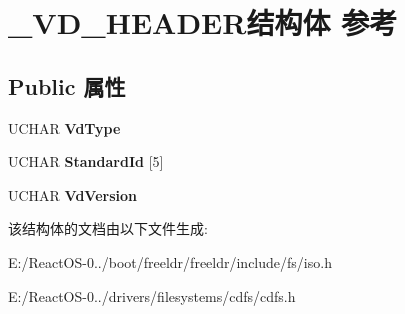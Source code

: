\hypertarget{struct___v_d___h_e_a_d_e_r}{}\section{\+\_\+\+V\+D\+\_\+\+H\+E\+A\+D\+E\+R结构体 参考}
\label{struct___v_d___h_e_a_d_e_r}
\subsection*{Public 属性}
\begin{DoxyCompactItemize}
\item 
\mbox{\label{struct___v_d___h_e_a_d_e_r_ae775148f905fba3faa16ce22cb9816e1}} 
U\+C\+H\+AR {\bfseries Vd\+Type}
\item 
\mbox{\label{struct___v_d___h_e_a_d_e_r_a36d795f6f8c83a13c972bb14d04192ff}} 
U\+C\+H\+AR {\bfseries Standard\+Id} \mbox{[}5\mbox{]}
\item 
\mbox{\label{struct___v_d___h_e_a_d_e_r_a6ae4719679f0ccec9a9e548a5f715c47}} 
U\+C\+H\+AR {\bfseries Vd\+Version}
\end{DoxyCompactItemize}


该结构体的文档由以下文件生成\+:\begin{DoxyCompactItemize}
\item 
E\+:/\+React\+O\+S-\/0../boot/freeldr/freeldr/include/fs/iso.\+h\item 
E\+:/\+React\+O\+S-\/0../drivers/filesystems/cdfs/cdfs.\+h\end{DoxyCompactItemize}
